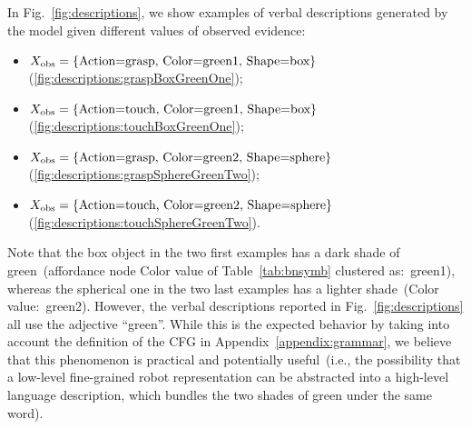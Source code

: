 \newcommand{\evidenceProducingGraspBoxGreenOne}{$\xobs = \{ \text{Action=grasp, Color=green1, Shape=box} \}$}
\newcommand{\evidenceProducingTouchBoxGreenOne}{$\xobs = \{ \text{Action=touch, Color=green1, Shape=box} \}$}
\newcommand{\evidenceProducingGraspSphereGreenTwo}{$\xobs = \{ \text{Action=grasp, Color=green2, Shape=sphere} \}$}
\newcommand{\evidenceProducingTouchSphereGreenTwo}{$\xobs = \{ \text{Action=touch, Color=green2, Shape=sphere} \}$}

In Fig.~\ref{fig:descriptions}, we show examples of verbal descriptions generated by the model given different values of observed evidence:
\begin{itemize}
\item \evidenceProducingGraspBoxGreenOne (\ref{fig:descriptions:graspBoxGreenOne});

\item \evidenceProducingTouchBoxGreenOne (\ref{fig:descriptions:touchBoxGreenOne});

\item \evidenceProducingGraspSphereGreenTwo (\ref{fig:descriptions:graspSphereGreenTwo});

\item \evidenceProducingTouchSphereGreenTwo (\ref{fig:descriptions:touchSphereGreenTwo}).
\end{itemize}
Note that the box object in the two first examples has a dark shade of green~(affordance node Color value of Table~\ref{tab:bnsymb} clustered as:~green1), whereas the spherical one in the two last examples has a lighter shade~(Color value:~green2).
However, the verbal descriptions reported in Fig.~\ref{fig:descriptions} all use the adjective ``green''.
While this is the expected behavior by taking into account the definition of the \ac{CFG} in Appendix~\ref{appendix:grammar}, we believe that this phenomenon is practical and potentially useful~(i.e., the possibility that a low-level fine-grained robot representation can be abstracted into a high-level language description, which bundles the two shades of green under the same word).

